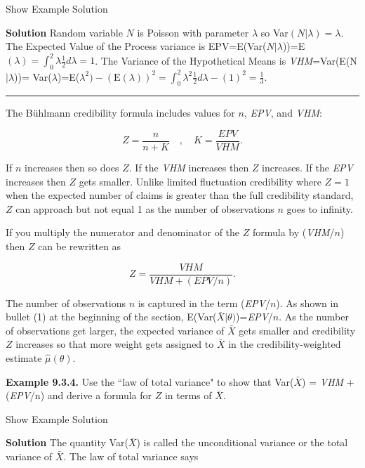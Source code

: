\documentclass[]{book}
\theoremstyle{definition}
\theoremstyle{definition}
\theoremstyle{definition}
\theoremstyle{remark}
\begin{document}
Show Example Solution

\hypertarget{toggleExampleCred.3.3}{}
\textbf{Solution} Random variable \(N\) is Poisson with parameter
\(\lambda\) so Var\((N|\lambda)=\lambda\). The Expected Value of the
Process variance is
EPV=E(Var(\(N|\lambda\)))=E\((\lambda)=\int_{0}^{2}\lambda \frac{1}{2} d\lambda=1\).
The Variance of the Hypothetical Means is
\emph{VHM}=Var(E(N\(|\lambda\)))=
Var(\(\lambda\))=E(\(\lambda^2)-(\mathrm{E}(\lambda))^2=\int_{0}^{2}\lambda^2 \frac{1}{2} d\lambda-(1)^2=\frac{1}{3}\).

\begin{center}\rule{0.5\linewidth}{\linethickness}\end{center}

The Bühlmann credibility formula includes values for \(n\), \emph{EPV},
and \emph{VHM}:

\begin{equation}
Z=\frac{n}{n+K} \quad , \quad K =\frac{EPV}{VHM}. 
\label{eq:buhlZ} 
\end{equation}

If \(n\) increases then so does \(Z\). If the \emph{VHM} increases then
\(Z\) increases. If the \emph{EPV} increases then \(Z\) gets smaller.
Unlike limited fluctuation credibility where \(Z=1\) when the expected
number of claims is greater than the full credibility standard, \(Z\)
can approach but not equal 1 as the number of observations \(n\) goes to
infinity.

If you multiply the numerator and denominator of the \(Z\) formula by
(\emph{VHM}/\(n\)) then \(Z\) can be rewritten as

\begin{equation*}
Z=\frac{VHM}{VHM+(EPV/n)} . 
\end{equation*}

The number of observations \(n\) is captured in the term
(\emph{EPV}/\(n\)). As shown in bullet (1) at the beginning of the
section, E(Var(\(\bar{X}|\theta)\))=\emph{EPV}/\(n\). As the number of
observations get larger, the expected variance of \(\bar{X}\) gets
smaller and credibility \(Z\) increases so that more weight gets
assigned to \(\bar{X}\) in the credibility-weighted estimate
\(\hat{\mu}(\theta)\).

\textbf{Example 9.3.4.} Use the ``law of total variance" to show that
Var(\(\bar{X}\)) = \emph{VHM} + (\emph{EPV}/n) and derive a formula for
\(Z\) in terms of \(\bar{X}\).

Show Example Solution

\hypertarget{toggleExampleCred.3.4}{}
\textbf{Solution} The quantity Var(\(\bar{X}\)) is called the
unconditional variance or the total variance of \(\bar{X}\). The law of
total variance says
\end{document}
